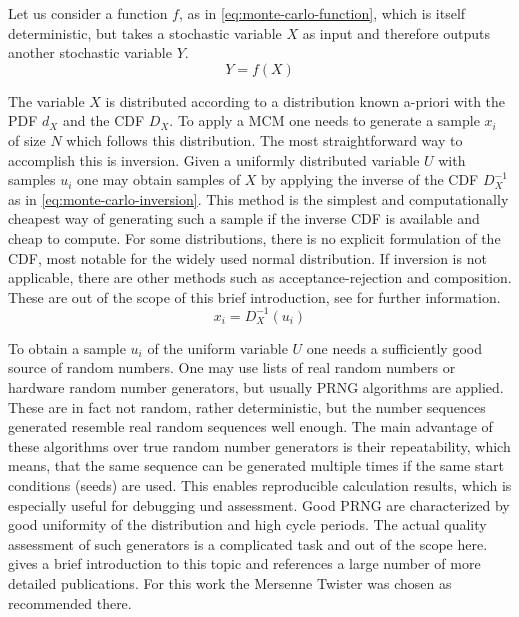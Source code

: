 Let us consider a function $f$, as in \cref{eq:monte-carlo-function}, which is itself deterministic, but takes a stochastic variable $X$ as input and therefore outputs another stochastic variable $Y$.
\begin{equation}
    Y = f(X)
    \label{eq:monte-carlo-function}
\end{equation}

The variable $X$ is distributed according to a distribution known a-priori with the \gls{PDF} $d_X$ and the \gls{CDF} $D_X$.
To apply a \gls{MCM} one needs to generate a sample $x_i$ of size $N$ which follows this distribution.
The most straightforward way to accomplish this is inversion.
Given a uniformly distributed variable $U$ with samples $u_i$ one may obtain samples of $X$ by applying the inverse of the \gls{CDF} $D_X^{-1}$ as in \cref{eq:monte-carlo-inversion}.
This method is the simplest and computationally cheapest way of generating such a sample if the inverse \gls{CDF} is available and cheap to compute.
For some distributions, there is no explicit formulation of the \gls{CDF}, most notable for the widely used normal distribution.
If inversion is not applicable, there are other methods such as acceptance-rejection and composition.
These are out of the scope of this brief introduction, see \textcite{Lemieux2009} for further information.
\begin{equation}
    x_i = D_X^{-1}(u_i)
    \label{eq:monte-carlo-inversion}
\end{equation}

To obtain a sample $u_i$ of the uniform variable $U$ one needs a sufficiently good source of random numbers.
One may use lists of real random numbers or hardware random number generators, but usually \gls{PRNG} algorithms are applied.
These are in fact not random, rather deterministic, but the number sequences generated resemble real random sequences well enough.
The main advantage of these algorithms over true random number generators is their repeatability, which means, that the same sequence can be generated multiple times if the same start conditions (seeds) are used.
This enables reproducible calculation results, which is especially useful for debugging und assessment.
Good \gls{PRNG} are characterized by good uniformity of the distribution and high cycle periods.
The actual quality assessment of such generators is a complicated task and out of the scope here.
\textcite{Lemieux2009} gives a brief introduction to this topic and references a large number of more detailed publications.
For this work the Mersenne Twister \cite{Matsumoto1998} was chosen as recommended there.

